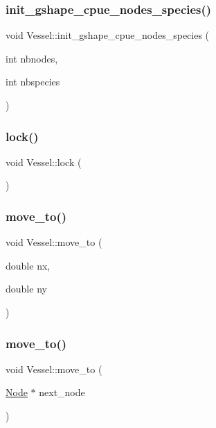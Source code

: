 \subsubsection{\texorpdfstring{init\_gshape\_cpue\_nodes\_species()}{init\_gshape\_cpue\_nodes\_species()}}
{\footnotesize\ttfamily void Vessel\+::init\+\_\+gshape\+\_\+cpue\+\_\+nodes\+\_\+species (\begin{DoxyParamCaption}\item[{int}]{nbnodes,  }\item[{int}]{nbspecies }\end{DoxyParamCaption})}

\mbox{\label{class_vessel_aa565776bbb7a278f4e622ea938819434}} 
\subsubsection{\texorpdfstring{lock()}{lock()}}
{\footnotesize\ttfamily void Vessel\+::lock (\begin{DoxyParamCaption}{ }\end{DoxyParamCaption})\hspace{0.3cm}{\ttfamily [inline]}}

\mbox{\label{class_vessel_a33faecffbd209fa2964c2bf5611e5d44}} 
\subsubsection{\texorpdfstring{move\_to()}{move\_to()}\hspace{0.1cm}{\footnotesize\ttfamily [1/2]}}
{\footnotesize\ttfamily void Vessel\+::move\+\_\+to (\begin{DoxyParamCaption}\item[{double}]{nx,  }\item[{double}]{ny }\end{DoxyParamCaption})}

\mbox{\label{class_vessel_a08d0e35331d361922add3b27223a4313}} 
\subsubsection{\texorpdfstring{move\_to()}{move\_to()}\hspace{0.1cm}{\footnotesize\ttfamily [2/2]}}
{\footnotesize\ttfamily void Vessel\+::move\+\_\+to (\begin{DoxyParamCaption}\item[{\mbox{\hyperlink{class_node}{Node}} $\ast$}]{next\+\_\+node }\end{DoxyParamCaption})}

